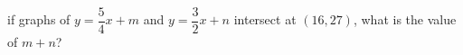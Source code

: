 if graphs of $y = \dfrac{5}{4} x + m$ and $y = \dfrac{3}{2} x + n$ intersect at $(16, 27)$, what is the value of $m + n$?
